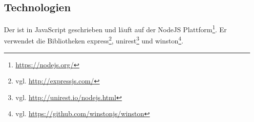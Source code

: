 \subsection{Technologien}
    Der {\annotationService} ist in JavaScript geschrieben und läuft auf der
    NodeJS Plattform\footnote{\url{https://nodejs.org/}}.
    Er verwendet die Bibliotheken
    express\footnote{vgl. \url{http://expressjs.com/}},
    unirest\footnote{vgl. \url{http://unirest.io/nodejs.html}}
    und winston\footnote{vgl. \url{https://github.com/winstonjs/winston}}.